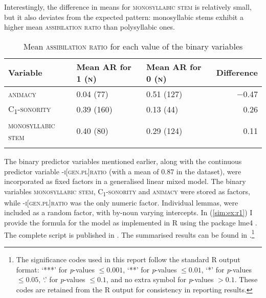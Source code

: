 \documentclass[output=paper,colorlinks,citecolor=brown]{langscibook}
\begin{document}
Interestingly, the difference in means for \textsc{monosyllabic stem} is relatively small, but it also deviates from the expected pattern: monosyllabic stems exhibit a higher mean \textsc{assibilation ratio} than polysyllabic ones.

\begin{table}
\caption{Mean \textsc{assibilation ratio} for each value of the binary variables}
\label{sim:tab:means1}
 \begin{tabularx}{\textwidth}{l Y Y r}
  \lsptoprule
Variable & Mean \textsc{AR} for \textsf{1} (\textsc{n}) & Mean \textsc{AR} for \textsf{0} (\textsc{n})  & Difference \\ 
 \midrule
\textsc{animacy} & 0.04 (77) & 0.51 (127) & $-$0.47 \\
\textsc{C\textsubscript{1}-sonority} & 0.39 (160) & 0.13 (44) & 0.26\\
\textsc{monosyllabic stem} & 0.40 (80) & 0.29 (124) & 0.11 \\
  \lspbottomrule
 \end{tabularx}
\end{table}


The binary predictor variables mentioned earlier, along with the continuous predictor variable \textsc{\nobreakdash-i[gen.pl]ratio} (with a mean of 0.87 in the dataset), were incorporated as fixed factors in a generalised linear mixed model. The binary variables \textsc{monosyllabic stem}, \textsc{C\textsubscript{1}-sonority} and \textsc{animacy} were stored as factors, while \textsc{\nobreakdash-i[gen.pl]ratio} was the only numeric factor. Individual lemmas, were included as a random factor, with by-noun varying intercepts. In (\ref{sim:ex:r1})
 I provide the formula for the model as implemented in R using the package lme4 \citep{bates2015fitting}. The complete script is published in \citet{Simonovic2024}. The summarised results can be found in .\footnote{The significance codes used in this report follow the standard R output format: 
‘***’ for \textit{p}-values $≤ 0.001$, ‘**’ for \textit{p}-values $≤ 0.01$, ‘*’ for \textit{p}-values $≤ 0.05$, ‘.’ for \textit{p}-values $≤ 0.1$, and no extra symbol for \textit{p}-values $> 0.1$. These codes are retained from the R output for consistency in reporting results.}
\end{document}
